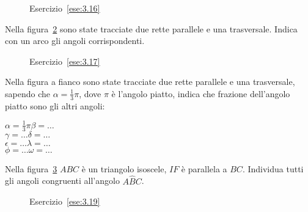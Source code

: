 \begin{inaccessibleblock}
 \begin{figure}[htb]
\centering
\caption{Esercizio~\ref{ese:3.16}}\label{fig:ese3.16}
\end{figure}
\end{inaccessibleblock}

\begin{esercizio}
\label{ese:3.17}
Nella figura~\ref{fig:ese3.17} sono state tracciate due rette 
parallele e una trasversale. Indica con un arco gli angoli 
corrispondenti.
\end{esercizio}

\begin{inaccessibleblock}
 \begin{figure}[htb]
\centering
\caption{Esercizio~\ref{ese:3.17}}\label{fig:ese3.17}
\end{figure}
\end{inaccessibleblock}

\begin{esercizio}
\label{ese:3.18}
Nella figura a fianco sono state tracciate due rette parallele e una 
trasversale, sapendo che \(\alpha=\frac{1}{3}\pi\), dove \(\pi\) è 
l'angolo piatto, indica che frazione dell'angolo piatto sono gli 
altri angoli:\\
\noindent\begin{minipage}{.5\textwidth}
\(\alpha=\frac{1}{3}\pi\)\tab\tab \(\beta = \ldots\)\\
\(\gamma=\ldots\)\tab\tab \(\delta = \ldots\)\\
\(\epsilon=\ldots\)\tab\tab \(\lambda = \ldots\)\\
\(\phi=\ldots\)\tab\tab \(\omega = \ldots\)
\end{minipage}\hfil
\begin{minipage}{.5\textwidth}
\centering
\end{minipage}
\end{esercizio}

\begin{esercizio}
\label{ese:3.19}
Nella figura~\ref{fig:ese3.19} \(ABC\) è un triangolo isoscele, \(IF\) è 
parallela a \(BC\). Individua tutti gli angoli congruenti all'angolo 
\(A\widehat{B}C\).
\end{esercizio}

\begin{inaccessibleblock}
 \begin{figure}[htb]
\centering
\caption{Esercizio~\ref{ese:3.19}}\label{fig:ese3.19}
\end{figure}
\end{inaccessibleblock}

